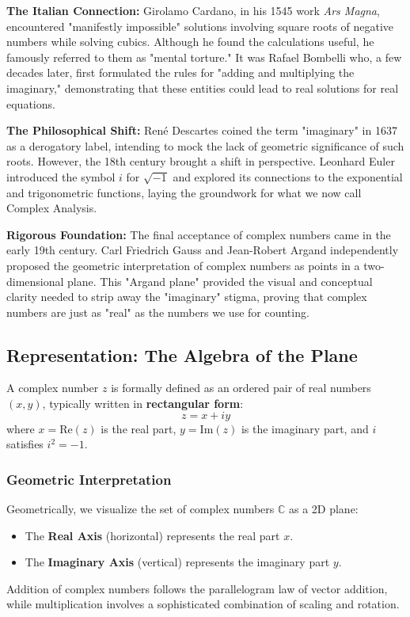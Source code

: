\textbf{The Italian Connection:} Girolamo Cardano, in his 1545 work \textit{Ars Magna}, encountered "manifestly impossible" solutions involving square roots of negative numbers while solving cubics. Although he found the calculations useful, he famously referred to them as "mental torture." It was Rafael Bombelli who, a few decades later, first formulated the rules for "adding and multiplying the imaginary," demonstrating that these entities could lead to real solutions for real equations.

\textbf{The Philosophical Shift:} René Descartes coined the term "imaginary" in 1637 as a derogatory label, intending to mock the lack of geometric significance of such roots. However, the 18th century brought a shift in perspective. Leonhard Euler introduced the symbol $i$ for $\sqrt{-1}$ and explored its connections to the exponential and trigonometric functions, laying the groundwork for what we now call Complex Analysis.

\textbf{Rigorous Foundation:} The final acceptance of complex numbers came in the early 19th century. Carl Friedrich Gauss and Jean-Robert Argand independently proposed the geometric interpretation of complex numbers as points in a two-dimensional plane. This "Argand plane" provided the visual and conceptual clarity needed to strip away the "imaginary" stigma, proving that complex numbers are just as "real" as the numbers we use for counting.

\subsection{Representation: The Algebra of the Plane}

A complex number $z$ is formally defined as an ordered pair of real numbers $(x, y)$, typically written in \textbf{rectangular form}:
\begin{equation}
    z = x + iy
\end{equation}
where $x = \text{Re}(z)$ is the real part, $y = \text{Im}(z)$ is the imaginary part, and $i$ satisfies $i^2 = -1$.

\subsubsection{Geometric Interpretation}

Geometrically, we visualize the set of complex numbers $\mathbb{C}$ as a 2D plane:
\begin{itemize}
    \item The \textbf{Real Axis} (horizontal) represents the real part $x$.
    \item The \textbf{Imaginary Axis} (vertical) represents the imaginary part $y$.
\end{itemize}
Addition of complex numbers follows the parallelogram law of vector addition, while multiplication involves a sophisticated combination of scaling and rotation.

